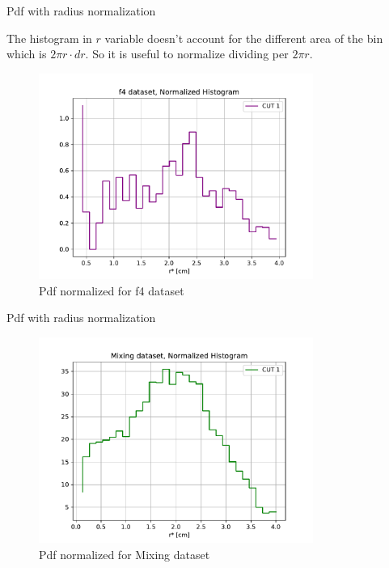 \documentclass[10pt]{beamer}
\begin{document}
\begin{frame}{Pdf with radius normalization}

The histogram in $r$ variable doesn't account for the different area of the bin which is $2 \pi r \cdot dr$. So it is useful to normalize dividing per $2 \pi r$.

\begin{figure}[hbtp]
\centering
\includegraphics[width = 0.8\textwidth]{Normalizedf4.pdf}
\caption{Pdf normalized for f4 dataset}
\end{figure}
\end{frame}

\begin{frame}{Pdf with radius normalization}

\begin{figure}[hbtp]
\centering
\includegraphics[width = 0.8\textwidth]{NormalizedMixing.pdf}
\caption{Pdf normalized for Mixing dataset}
\end{figure}
\end{frame}
\end{document}
